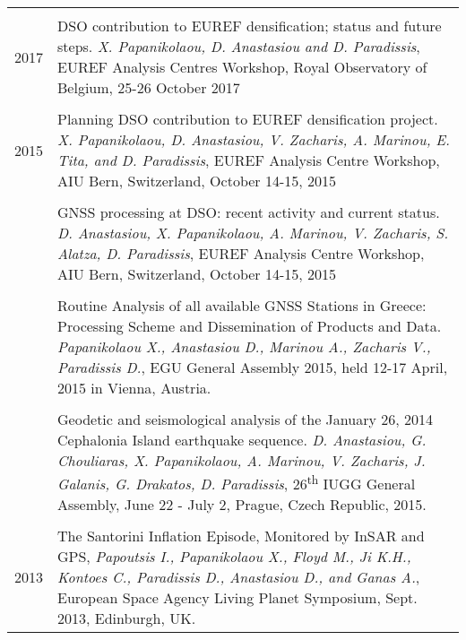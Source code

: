 \documentclass[a4paper,10pt]{article} %
\begin{document}
\begin{longtable}{r|p{14cm}}

\multicolumn{2}{c}{} \\
  \textsc{2017}
  & DSO contribution to EUREF densification; status and future steps.
  \emph{X. Papanikolaou, D. Anastasiou and D. Paradissis},
  EUREF Analysis Centres Workshop, Royal Observatory of Belgium, 25-26 October 2017\\
 
\multicolumn{2}{c}{} \\
  \textsc{2015}
  & Planning DSO contribution to EUREF densification project.
  \emph{X. Papanikolaou, D. Anastasiou, V. Zacharis, A. Marinou, E. Tita, and D. Paradissis},
  EUREF Analysis Centre Workshop, AIU Bern, Switzerland, October 14-15, 2015\\

  &\\

  & GNSS processing at DSO: recent activity and current status.
  \emph{D. Anastasiou, X. Papanikolaou, A. Marinou, V. Zacharis, S. Alatza, D. Paradissis},
  EUREF Analysis Centre Workshop, AIU Bern, Switzerland, October 14-15, 2015\\

  &\\

  & Routine Analysis of all available GNSS Stations in Greece: Processing Scheme and Dissemination of Products and Data.
  \emph{Papanikolaou X., Anastasiou D., Marinou A., Zacharis V., Paradissis D.},
  EGU General Assembly 2015, held 12-17 April, 2015 in Vienna, Austria.\\

  &\\

  & Geodetic and seismological analysis of the January 26, 2014 Cephalonia Island earthquake sequence.
  \emph{D. Anastasiou, G. Chouliaras, X. Papanikolaou, A. Marinou, V. Zacharis, J. Galanis, G. Drakatos, D. Paradissis},
  26\textsuperscript{th} IUGG General Assembly, June 22 - July 2, Prague, Czech Republic, 2015.\\
  
\multicolumn{2}{c}{} \\
  \textsc{2013}
  & The Santorini Inflation Episode, Monitored by InSAR and GPS,
  \emph{Papoutsis I., Papanikolaou X., Floyd M., Ji K.H., Kontoes C., Paradissis D., Anastasiou D., and Ganas A.},
  European Space Agency Living Planet Symposium, Sept. 2013, Edinburgh, UK.\\


\end{longtable}
\end{document}
